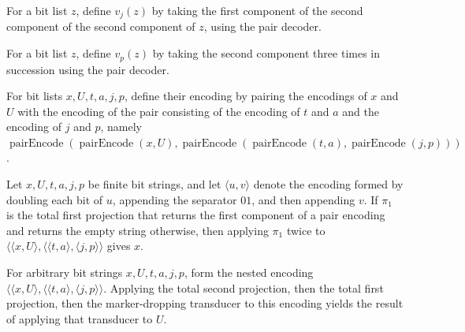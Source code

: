 \begin{definition}
\label{Complexity.Meyer.vj}
\leanok
{}
For a bit list $z$, define $v_j(z)$ by taking the first component of the second
component of the second component of $z$, using the pair decoder.
\end{definition}

\begin{definition}
\label{Complexity.Meyer.vp}
\leanok
{}
For a bit list $z$, define $v_p(z)$ by taking the second component three times in
succession using the pair decoder.
\end{definition}

\begin{definition}
\label{Complexity.Meyer.vin}
\leanok
{}
For bit lists $x,U,t,a,j,p$, define their encoding by pairing the encodings of $x$ and
$U$ with the encoding of the pair consisting of the encoding of $t$ and $a$ and the
encoding of $j$ and $p$, namely
$\operatorname{pairEncode}(\operatorname{pairEncode}(x,U),\operatorname{pairEncode}(\operatorname{pairEncode}(t,a),\operatorname{pairEncode}(j,p)))$.
\end{definition}

\begin{theorem}
\label{Complexity.Meyer.vx_vin}
\leanok
{}
Let $x,U,t,a,j,p$ be finite bit strings, and let $\langle u,v\rangle$ denote the
encoding formed by doubling each bit of $u$, appending the separator $01$, and then
appending $v$. If $\pi_1$ is the total first projection that returns the first component
of a pair encoding and returns the empty string otherwise, then applying $\pi_1$ twice
to $\langle\langle x,U\rangle,\langle\langle t,a\rangle,\langle j,p\rangle\rangle$ gives
$x$.
\end{theorem}

\begin{theorem}
\label{Complexity.Meyer.vD_vin}
\leanok
{}
For arbitrary bit strings $x,U,t,a,j,p$, form the nested encoding $\langle\langle
x,U\rangle,\langle\langle t,a\rangle,\langle j,p\rangle\rangle$. Applying the total
second projection, then the total first projection, then the marker-dropping transducer
to this encoding yields the result of applying that transducer to $U$.
\end{theorem}


